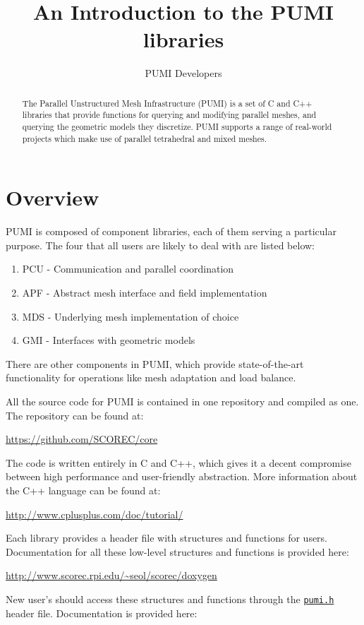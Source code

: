 \documentclass{article}
\author{PUMI Developers}
\title{An Introduction to the PUMI libraries}
\begin{document}
\maketitle

\begin{abstract}
The Parallel Unstructured Mesh Infrastructure (PUMI) is
a set of C and C++ libraries that provide
functions for querying and modifying parallel meshes, and
querying the geometric models they discretize.
PUMI supports a range of real-world projects
which make use of parallel tetrahedral and
mixed meshes.
\end{abstract}

\section{Overview}
PUMI is composed of component libraries, each of
them serving a particular purpose.
The four that all users are likely to deal with
are listed below:

\begin{enumerate}
\item PCU - Communication and parallel coordination
\item APF - Abstract mesh interface and field implementation
\item MDS - Underlying mesh implementation of choice
\item GMI - Interfaces with geometric models
\end{enumerate}

There are other components in PUMI, which provide
state-of-the-art functionality for operations like
mesh adaptation and load balance.

All the source code for PUMI is contained in one
repository and compiled as one.
The repository can be found at:

\url{https://github.com/SCOREC/core}

The code is written entirely in C and C++, which
gives it a decent compromise between high performance
and user-friendly abstraction.
More information about the C++ language can be found at:

\url{http://www.cplusplus.com/doc/tutorial/}

Each library provides a header file with structures
and functions for users.
Documentation for all these low-level structures and
functions is provided here:

\url{http://www.scorec.rpi.edu/~seol/scorec/doxygen}

New user's should access these structures and functions through the
\href{https://github.com/SCOREC/core/blob/master/pumi/pumi.h}
{\texttt{pumi.h}} header file.
Documentation is provided here:
\end{document}
